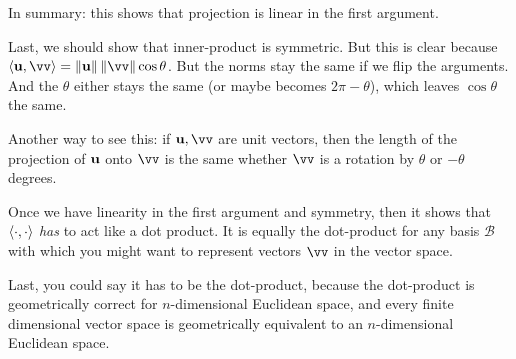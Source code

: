 In summary: this shows that projection is linear in the first argument.

Last, we should show that inner-product is symmetric. But this is clear
because $\innerprod{\vu}{\vv} = \norm{\vu}\norm{\vv} \cos\theta$. But
the norms stay the same if we flip the arguments. And the $\theta$
either stays the same (or maybe becomes $2\pi - \theta$), which leaves
$\cos\theta$ the same.

Another way to see this: if $\vu, \vv$ are unit vectors, then the length
of the projection of $\bm{\mathrm{u}}$ onto $\vv$ is the same whether $\vv$ is a
rotation by $\theta$ or $-\theta$ degrees.

Once we have linearity in the first argument and symmetry, then it shows
that $\left\langle \cdot, \cdot \right\rangle$ \emph{has} to act like a dot product. It
is equally the dot-product for any basis $\mathcal{B}$ with which you
might want to represent vectors $\vv$ in the vector space.

Last, you could say it has to be the dot-product, because the
dot-product is geometrically correct for $n$-dimensional Euclidean
space, and every finite dimensional vector space is geometrically
equivalent to an $n$-dimensional Euclidean space.
